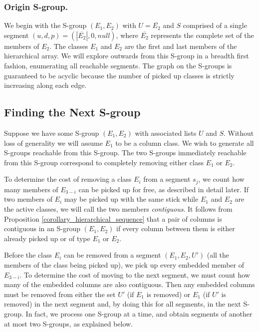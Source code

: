 \subsubsection{Origin S-group.}
We begin with the S-group $(E_1,E_2)$ with $U = \overline{E_2}$ and $S$ comprised of a single segment $(u,d,p) = (|\overline{E_2}|,0,null)$, where  $\overline{E_2}$ represents the complete set of the members of $E_2$.
The classes $E_1$ and $E_2$ are the first and last members of the
hierarchical array.
We will explore outwards from this S-group in a breadth first fashion, enumerating all reachable segments.
The graph on the S-groups is guaranteed to be acyclic because the number of picked up classes is strictly increasing along each edge.




\subsection{Finding the Next S-group}


Suppose we have some S-group $(E_1, E_2)$ with associated lists $U$ and $S$.
Without loss of generality we will assume $E_1$ to be a column class.
We wish to generate all S-groups reachable from this S-group.
The two S-groups immediately reachable from this S-group correspond to completely removing either class $E_1$ or $E_2$.

To determine the cost of removing a class $E_i$ from a segment $s_j$,
we count how many members of $E_{3-i}$
can be picked up for free, as described in detail later.
If two members of $E_i$ may be picked up with the same stick
while $E_1$ and $E_2$ are the active classes, we will call the
two members {\em contiguous}. It follows from Proposition
\ref{corollary_hierarchical_sequence}
that a pair of columns is contiguous in an S-group $(E_1,E_2)$ if every column
between them is either already picked up or of type $E_1$ or $E_2$.

Before the class $E_i$ can be removed from a segment  $(E_1,E_2,U')$
(all the members of the class being picked up),
we pick up every embedded member of $E_{3-i}$.
To determine the cost of moving to the next segment,
we must count how many of the embedded columns are also contiguous.
Then any embedded columns must be removed from either
the set $U'$ (if $E_1$ is removed) or $E_1$ (if $U'$ is removed) in the next
segment and, by doing this for all segments, in the next S-group.
In fact, we process one S-group at a time, and obtain segments of
another at most two S-groups, as explained below.

